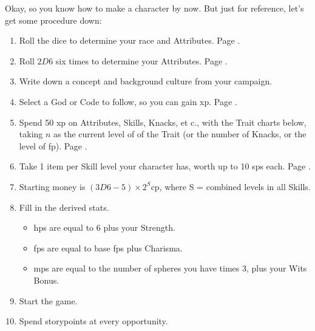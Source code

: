 \begin{multicols}{2}

\noindent
Okay, so you know how to make a character by now.  But just for reference, let's get some procedure down:

\begin{enumerate}
  \item\label{sumCCrace}
  Roll the dice to determine your race and Attributes.  Page \pageref{character_rolls}.
  \item\label{sumCCatt}
  Roll $2D6$ six times to determine your Attributes.
  Page \pageref{randomAttributes}.
  \item\label{sumCCconcept}
  Write down a concept and background culture from your campaign.
  \item\label{sumCCcode}
  Select a God or Code to follow, so you can gain \gls{xp}.  Page \pageref{gods_codes}.
  \item\label{sumCCxp}
  Spend 50 \gls{xp} on Attributes, Skills, Knacks, et c., with the Trait charts below, taking $n$ as the current level of of the Trait (or the number of Knacks, or the level of \gls{fp}).
  Page \pageref{xp}.
  \item\label{sumCCequip}
  Take 1 item per Skill level your character has, worth up to 10 \glspl{sp} each.  Page \pageref{start_equipment}.
  \item\label{sumCCcoin}
  Starting money is $(3D6-5)\times 2^S$\gls{cp}, where S = combined levels in all Skills.
  \item
  Fill in the derived stats.
  \begin{itemize}

    \item
    \glspl{hp} are equal to 6 plus your Strength.
    \item
    \glspl{fp} are equal to base \glspl{fp} plus Charisma.
    \item
    \glspl{mp} are equal to the number of spheres you have times 3, plus your Wits Bonus.

  \end{itemize}
  \item
  Start the game.
  \item
  Spend \glspl{storypoint} at every opportunity.
\end{enumerate}

\end{multicols}

\vfill\null

\begin{multicols}{2}
  \racechart
  \attributeChart
\end{multicols}

